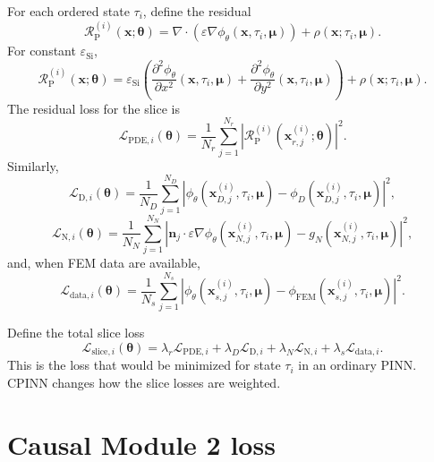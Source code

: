 \documentclass[11pt]{article}
\newcommand{\thetav}{\bm{\theta}}
\newcommand{\xv}{\bm{x}}
\newcommand{\muv}{\bm{\mu}}
\newcommand{\nvecb}{\mathbf{n}}
\newcommand{\epss}{\varepsilon_{\mathrm{Si}}}
\newcommand{\phinn}{\phi_{\theta}}
\newcommand{\Rpoisson}{\mathcal{R}_{\mathrm{P}}}
\newcommand{\taud}{\tau}
\begin{document}
For each ordered state $\taud_i$, define the residual
\begin{equation}
\Rpoisson^{(i)}(\xv;\thetav)
=\nabla\cdot\left(\varepsilon\nabla\phinn(\xv,\taud_i,\muv)\right)+\rho(\xv;\taud_i,\muv).
\label{eq:slice_poisson_residual}
\end{equation}
For constant $\epss$,
\begin{equation}
\Rpoisson^{(i)}(\xv;\thetav)=
\epss\left(
\frac{\partial^2\phinn}{\partial x^2}(\xv,\taud_i,\muv)
+
\frac{\partial^2\phinn}{\partial y^2}(\xv,\taud_i,\muv)
\right)+\rho(\xv;\taud_i,\muv).
\label{eq:slice_poisson_residual_constant_eps}
\end{equation}
The residual loss for the slice is
\begin{equation}
\mathcal{L}_{\mathrm{PDE},i}(\thetav)=\frac{1}{N_r}\sum_{j=1}^{N_r}
\left|\Rpoisson^{(i)}(\xv_{r,j}^{(i)};\thetav)\right|^2.
\label{eq:slice_pde_loss}
\end{equation}
Similarly,
\begin{equation}
\mathcal{L}_{\mathrm{D},i}(\thetav)=\frac{1}{N_D}\sum_{j=1}^{N_D}
\left|\phinn(\xv_{D,j}^{(i)},\taud_i,\muv)-\phi_D(\xv_{D,j}^{(i)},\taud_i,\muv)\right|^2,
\label{eq:slice_dirichlet_loss}
\end{equation}
\begin{equation}
\mathcal{L}_{\mathrm{N},i}(\thetav)=\frac{1}{N_N}\sum_{j=1}^{N_N}
\left|\nvecb_j\cdot\varepsilon\nabla\phinn(\xv_{N,j}^{(i)},\taud_i,\muv)-g_N(\xv_{N,j}^{(i)},\taud_i,\muv)\right|^2,
\label{eq:slice_neumann_loss}
\end{equation}
and, when FEM data are available,
\begin{equation}
\mathcal{L}_{\mathrm{data},i}(\thetav)=\frac{1}{N_s}\sum_{j=1}^{N_s}
\left|\phinn(\xv_{s,j}^{(i)},\taud_i,\muv)-\phi_{\mathrm{FEM}}(\xv_{s,j}^{(i)},\taud_i,\muv)\right|^2.
\label{eq:slice_data_loss}
\end{equation}

Define the total slice loss
\begin{equation}
\mathcal{L}_{\mathrm{slice},i}(\thetav)=
\lambda_r\mathcal{L}_{\mathrm{PDE},i}+
\lambda_D\mathcal{L}_{\mathrm{D},i}+
\lambda_N\mathcal{L}_{\mathrm{N},i}+
\lambda_s\mathcal{L}_{\mathrm{data},i}.
\label{eq:slice_total_loss}
\end{equation}
This is the loss that would be minimized for state $\taud_i$ in an ordinary PINN. CPINN changes how the slice losses are weighted.

\section{Causal Module 2 loss}
\end{document}
